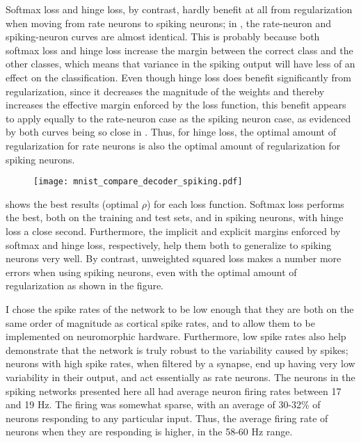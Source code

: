 Softmax loss and hinge loss, by contrast,
hardly benefit at all from regularization
when moving from rate neurons to spiking neurons;
in ,
the rate-neuron and spiking-neuron curves are almost identical.
This is probably because both softmax loss and hinge loss
increase the margin between the correct class and the other classes,
which means that variance in the spiking output
will have less of an effect on the classification.
Even though hinge loss does benefit significantly from regularization,
since it decreases the magnitude of the weights
and thereby increases the effective margin enforced by the loss function,
this benefit appears to apply equally to the rate-neuron case
as the spiking neuron case,
as evidenced by both curves being so close in .
Thus, for hinge loss, the optimal amount of regularization
for rate neurons is also the optimal amount of regularization for spiking neurons.

\begin{figure}
  \centering
  \texttt{[image: mnist\_compare\_decoder\_spiking.pdf]}
\end{figure}

 shows the best results (optimal $\rho$)
for each loss function.
Softmax loss performs the best, both on the training and test sets,
and in spiking neurons, with hinge loss a close second.
Furthermore, the implicit and explicit margins enforced by
softmax and hinge loss, respectively,
help them both to generalize to spiking neurons very well.
By contrast, unweighted squared loss makes a number more errors
when using spiking neurons,
even with the optimal amount of regularization as shown in the figure.

I chose the spike rates of the network to be low enough
that they are both on the same order of magnitude as cortical spike rates,
and to allow them to be implemented on neuromorphic hardware.
Furthermore, low spike rates also help demonstrate that the network
is truly robust to the variability caused by spikes;
neurons with high spike rates, when filtered by a synapse,
end up having very low variability in their output,
and act essentially as rate neurons.
The neurons in the spiking networks presented here all had
average neuron firing rates between 17 and 19 Hz.
The firing was somewhat sparse, with an average of 30-32\% of neurons
responding to any particular input.
Thus, the average firing rate of neurons when they are responding is higher,
in the 58-60 Hz range.


